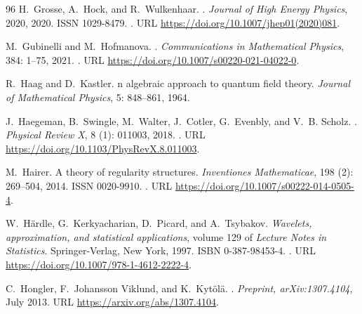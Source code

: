 \documentclass[a4paper, 11pt]{article}
\DeclareMathOperator{\1}{\mathds{1}}
\begin{document}
\begin{thebibliography}{96}
H.~Grosse, A.~Hock, and R.~Wulkenhaar.
.
\newblock \emph{Journal of High Energy Physics}, 2020, 2020.
\newblock ISSN 1029-8479.
\newblock {}.
\newblock URL \url{https://doi.org/10.1007/jhep01(2020)081}.

M.~Gubinelli and M.~Hofmanova.
.
\newblock \emph{Communications in Mathematical Physics}, 384: 1--75,
  2021.
\newblock {}.
\newblock URL \url{https://doi.org/10.1007/s00220-021-04022-0}.

R.~{H}aag and D.~{K}astler.
n algebraic approach to quantum field theory.
\newblock \emph{{J}ournal of {M}athematical {P}hysics}, 5: 848--861,
  1964.

J.~Haegeman, B.~Swingle, M.~Walter, J.~Cotler, G.~Evenbly, and V.~B. Scholz.
.
\newblock \emph{Physical Review X}, 8 (1): 011003, 2018.
\newblock {}.
\newblock URL \url{https://doi.org/10.1103/PhysRevX.8.011003}.

M.~Hairer.
\newblock A theory of regularity structures.
\newblock \emph{Inventiones Mathematicae}, 198 (2): 269--504,
  2014.
\newblock ISSN 0020-9910.
\newblock {}.
\newblock URL \url{https://doi.org/10.1007/s00222-014-0505-4}.

W.~H\"{a}rdle, G.~Kerkyacharian, D.~Picard, and A.~Tsybakov.
\newblock \emph{Wavelets, approximation, and statistical applications}, volume
  129 of \emph{Lecture Notes in Statistics}.
\newblock Springer-Verlag, New York, 1997.
\newblock ISBN 0-387-98453-4.
\newblock {}.
\newblock URL \url{https://doi.org/10.1007/978-1-4612-2222-4}.

C.~{Hongler}, F.~{Johansson Viklund}, and K.~{Kyt{\"o}l{\"a}}.
.
\newblock \emph{Preprint, arXiv:1307.4104}, July 2013.
\newblock URL \url{https://arxiv.org/abs/1307.4104}.


\end{thebibliography}
\end{document}
